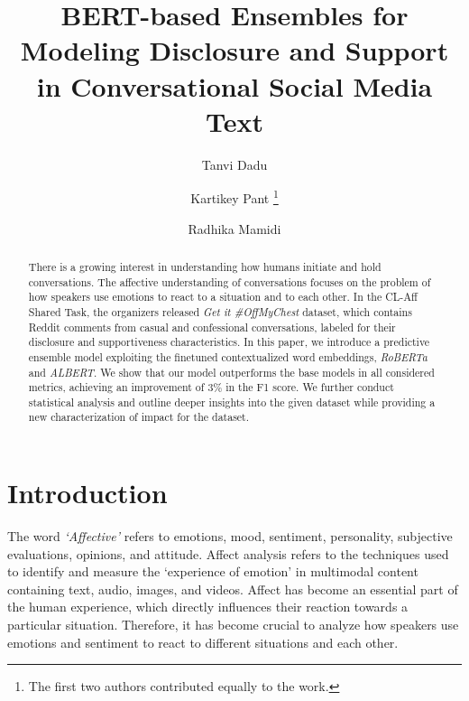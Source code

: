 \documentclass[runningheads]{llncs}
\makeatletter
\newcommand{\printfnsymbol}[1]{\textsuperscript{\@fnsymbol{#1}}}
\makeatother
\begin{document}
\title{BERT-based Ensembles for Modeling Disclosure and Support in Conversational Social Media Text}
\author{Tanvi Dadu \printfnsymbol{1} \and 
Kartikey Pant \thanks{The first two authors contributed equally to the work.} \and 
Radhika Mamidi}
\maketitle              \begin{abstract}
There is a growing interest in understanding how humans initiate and hold conversations. The affective understanding of conversations focuses on the problem of how speakers use emotions to react to a situation and to each other. In the CL-Aff Shared Task, the organizers released \textit{Get it \#OffMyChest} dataset, which contains Reddit comments from casual and confessional conversations, labeled for their disclosure and supportiveness characteristics. In this paper, we introduce a predictive ensemble model exploiting the finetuned contextualized word embeddings, \textit{RoBERTa} and \textit{ALBERT}. We show that our model outperforms the base models in all considered metrics, achieving an improvement of $3\%$ in the F1 score. We further conduct statistical analysis and outline deeper insights into the given dataset while providing a new characterization of impact for the dataset.

\end{abstract}
\section{Introduction}
The word \textit{‘Affective’} refers to emotions, mood, sentiment, personality, subjective evaluations, opinions, and attitude. Affect analysis refers to the techniques used to identify and measure the ‘experience of emotion’ in multimodal content containing text, audio, images, and videos.\cite{Rajendran2019HappyTL} Affect has become an essential part of the human experience, which directly influences their reaction towards a particular situation. Therefore, it has become crucial to analyze how speakers use emotions and sentiment to react to different situations and each other.
\end{document}
